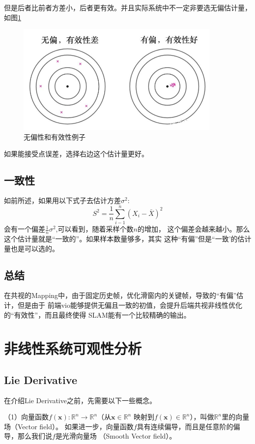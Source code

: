 \documentclass{article}
\begin{document}
但是后者比前者方差小，后者更有效。并且实际系统中不一定非要选无偏估计量，如图\ref{figs:biasAndEffective}
\begin{figure}[ht]
    \centering
    \includegraphics[width=10cm]{figure8.jpg}
    \caption{无偏性和有效性例子}
    \label{figs:biasAndEffective}
\end{figure}
如果能接受点误差，选择右边这个估计量更好。

\subsection{一致性}
如前所述，如果用以下式子去估计方差$\sigma^2$:
\begin{equation}
    S^2=\frac{1}{n}\sum\limits_{i-1}^n{(X_i-\bar{X})^2}
\end{equation}
会有一个偏差$\frac{1}{n}\sigma^2$,可以看到，随着采样个数$n$的增加，
这个偏差会越来越小。那么这个估计量就是“一致的”。如果样本数量够多，其实
这种“有偏”但是“一致'的估计量也是可以选的。
\subsection{总结}
在共视的Mapping中，由于固定历史帧，优化滑窗内的关键帧，导致的“有偏”估计，但是由于
前端vio能够提供无偏且一致的初值，会提升后端共视非线性优化的“有效性”，而且最终使得
SLAM能有一个比较精确的输出。

\section{非线性系统可观性分析}
\subsection{Lie Derivative}
在介绍Lie Derivative之前，先需要以下一些概念。\par

（1）向量函数$f(\textbf{x}):\mathbb{R}^n\rightarrow\mathbb{R}^n$（从$\textbf{x}\in\mathbb{R}^n$
映射到$f(\textbf{x})\in\mathbb{R}^n$），叫做$\mathbb{R}^n$里的向量场（Vector field）。
如果进一步，向量函数$f$具有连续偏导，而且是任意阶的偏导，那么我们说$f$是光滑向量场
（Smooth Vector field）。\par
\end{document}
